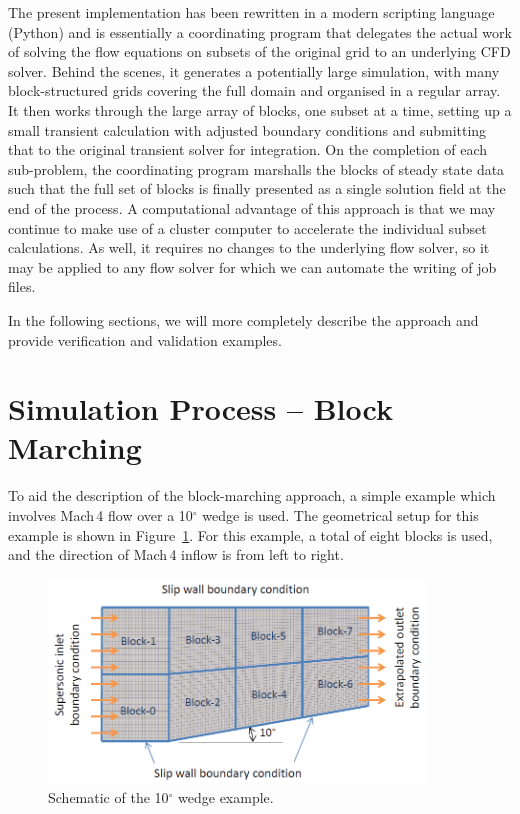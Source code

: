 \documentclass[12pt,a4paper,twoside]{article}
\begin{document}
\medskip
The present implementation has been rewritten in a modern scripting language (Python) 
and is essentially a coordinating program that delegates the actual work 
of solving the flow equations on subsets of the original grid to an underlying CFD solver.  
Behind the scenes, it generates a potentially large simulation, 
with many block-structured grids covering the full domain and organised in a regular array.  
It then works through the large array of blocks, one subset at a time, 
setting up a small transient calculation with adjusted boundary conditions and 
submitting that to the original transient solver for integration.  
On the completion of each sub-problem, the coordinating program marshalls the blocks 
of steady state data such that the full set of blocks is finally presented 
as a single solution field at the end of the process.  
A computational advantage of this approach is that we may continue to make use 
of a cluster computer to accelerate the individual subset calculations.  
As well, it requires no changes to the underlying flow solver, 
so it may be applied to any flow solver for which we can automate the writing of job files. 

\medskip
In the following sections, we will more completely describe the approach 
and provide verification and validation examples.  


\section{Simulation Process -- Block Marching}
%
To aid the description of the block-marching approach, a simple example which involves 
Mach\,4 flow over a 10$^\circ$ wedge is used. The geometrical setup for this example is 
shown in Figure~\ref{f:10-deg-wedge-schema}. For this example, a total of eight blocks is 
used, and the direction of Mach\,4 inflow is from left to right.
%
\begin{figure}[htbp]
   \centerline{ \includegraphics[width=10cm]{figs/10-deg-wedge-schematic.png} }
   \caption{Schematic of the 10$^\circ$ wedge example.}
   \label{f:10-deg-wedge-schema}
\end{figure}
\end{document}
